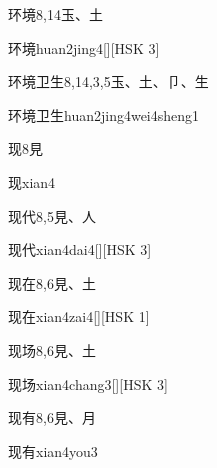 \begin{entry}{环境}{8,14}{⽟、⼟}
  \begin{phonetics}{环境}{huan2jing4}[][HSK 3]
  \end{phonetics}
\end{entry}

\begin{entry}{环境卫生}{8,14,3,5}{⽟、⼟、⼙、⽣}
  \begin{phonetics}{环境卫生}{huan2jing4wei4sheng1}
  \end{phonetics}
\end{entry}

\begin{entry}{现}{8}{⾒}
  \begin{phonetics}{现}{xian4}
  \end{phonetics}
\end{entry}

\begin{entry}{现代}{8,5}{⾒、⼈}
  \begin{phonetics}{现代}{xian4dai4}[][HSK 3]
  \end{phonetics}
\end{entry}

\begin{entry}{现在}{8,6}{⾒、⼟}
  \begin{phonetics}{现在}{xian4zai4}[][HSK 1]
  \end{phonetics}
\end{entry}

\begin{entry}{现场}{8,6}{⾒、⼟}
  \begin{phonetics}{现场}{xian4chang3}[][HSK 3]
  \end{phonetics}
\end{entry}

\begin{entry}{现有}{8,6}{⾒、⽉}
  \begin{phonetics}{现有}{xian4you3}
  \end{phonetics}
\end{entry}

